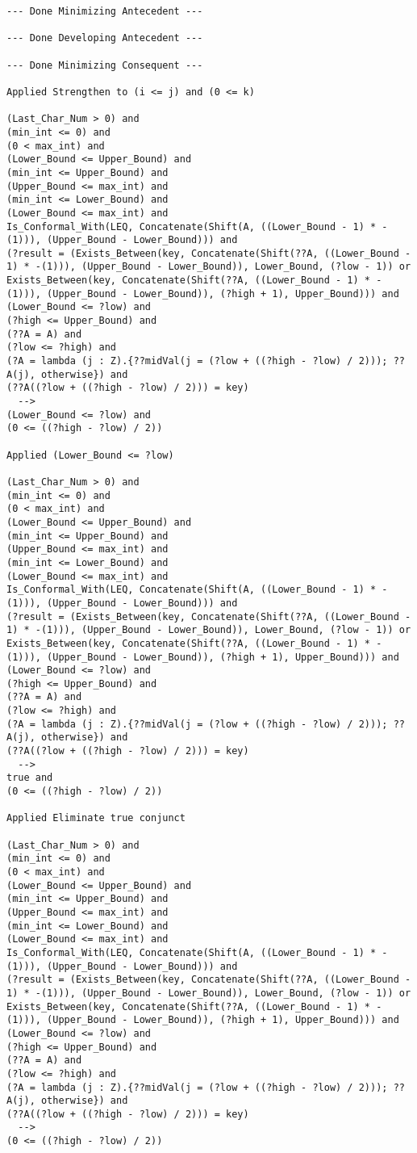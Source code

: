 \begin{lstlisting}[language=resolve]
--- Done Minimizing Antecedent ---

--- Done Developing Antecedent ---

--- Done Minimizing Consequent ---

Applied Strengthen to (i <= j) and (0 <= k)

(Last_Char_Num > 0) and
(min_int <= 0) and
(0 < max_int) and
(Lower_Bound <= Upper_Bound) and
(min_int <= Upper_Bound) and
(Upper_Bound <= max_int) and
(min_int <= Lower_Bound) and
(Lower_Bound <= max_int) and
Is_Conformal_With(LEQ, Concatenate(Shift(A, ((Lower_Bound - 1) * -(1))), (Upper_Bound - Lower_Bound))) and
(?result = (Exists_Between(key, Concatenate(Shift(??A, ((Lower_Bound - 1) * -(1))), (Upper_Bound - Lower_Bound)), Lower_Bound, (?low - 1)) or Exists_Between(key, Concatenate(Shift(??A, ((Lower_Bound - 1) * -(1))), (Upper_Bound - Lower_Bound)), (?high + 1), Upper_Bound))) and
(Lower_Bound <= ?low) and
(?high <= Upper_Bound) and
(??A = A) and
(?low <= ?high) and
(?A = lambda (j : Z).{??midVal(j = (?low + ((?high - ?low) / 2))); ??A(j), otherwise}) and
(??A((?low + ((?high - ?low) / 2))) = key)
  -->
(Lower_Bound <= ?low) and
(0 <= ((?high - ?low) / 2))

Applied (Lower_Bound <= ?low)

(Last_Char_Num > 0) and
(min_int <= 0) and
(0 < max_int) and
(Lower_Bound <= Upper_Bound) and
(min_int <= Upper_Bound) and
(Upper_Bound <= max_int) and
(min_int <= Lower_Bound) and
(Lower_Bound <= max_int) and
Is_Conformal_With(LEQ, Concatenate(Shift(A, ((Lower_Bound - 1) * -(1))), (Upper_Bound - Lower_Bound))) and
(?result = (Exists_Between(key, Concatenate(Shift(??A, ((Lower_Bound - 1) * -(1))), (Upper_Bound - Lower_Bound)), Lower_Bound, (?low - 1)) or Exists_Between(key, Concatenate(Shift(??A, ((Lower_Bound - 1) * -(1))), (Upper_Bound - Lower_Bound)), (?high + 1), Upper_Bound))) and
(Lower_Bound <= ?low) and
(?high <= Upper_Bound) and
(??A = A) and
(?low <= ?high) and
(?A = lambda (j : Z).{??midVal(j = (?low + ((?high - ?low) / 2))); ??A(j), otherwise}) and
(??A((?low + ((?high - ?low) / 2))) = key)
  -->
true and
(0 <= ((?high - ?low) / 2))

Applied Eliminate true conjunct

(Last_Char_Num > 0) and
(min_int <= 0) and
(0 < max_int) and
(Lower_Bound <= Upper_Bound) and
(min_int <= Upper_Bound) and
(Upper_Bound <= max_int) and
(min_int <= Lower_Bound) and
(Lower_Bound <= max_int) and
Is_Conformal_With(LEQ, Concatenate(Shift(A, ((Lower_Bound - 1) * -(1))), (Upper_Bound - Lower_Bound))) and
(?result = (Exists_Between(key, Concatenate(Shift(??A, ((Lower_Bound - 1) * -(1))), (Upper_Bound - Lower_Bound)), Lower_Bound, (?low - 1)) or Exists_Between(key, Concatenate(Shift(??A, ((Lower_Bound - 1) * -(1))), (Upper_Bound - Lower_Bound)), (?high + 1), Upper_Bound))) and
(Lower_Bound <= ?low) and
(?high <= Upper_Bound) and
(??A = A) and
(?low <= ?high) and
(?A = lambda (j : Z).{??midVal(j = (?low + ((?high - ?low) / 2))); ??A(j), otherwise}) and
(??A((?low + ((?high - ?low) / 2))) = key)
  -->
(0 <= ((?high - ?low) / 2))


\end{lstlisting}
